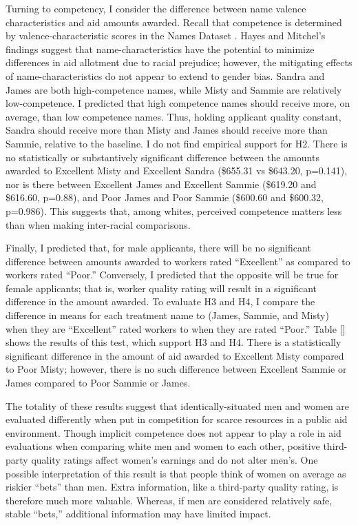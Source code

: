 \documentclass[12pt]{article}%
\begin{document}
\begin{doublespace}
Turning to competency, I consider the difference between name valence characteristics and aid amounts awarded. Recall that competence is determined by valence-characteristic scores in the Names Dataset \citep{hayes_2020}. Hayes and Mitchel’s findings suggest that name-characteristics have the potential to minimize differences in aid allotment due to racial prejudice; however, the mitigating effects of name-characteristics do not appear to extend to gender bias. Sandra and James are both high-competence names, while Misty and Sammie are relatively low-competence. I predicted that high competence names should receive more, on average, than low competence names. Thus, holding applicant quality constant, Sandra should receive more than Misty and James should receive more than Sammie, relative to the baseline. I do not find empirical support for H2. There is no statistically or substantively significant difference between the amounts awarded to Excellent Misty and Excellent Sandra (\$655.31 vs \$643.20, p=0.141), nor is there between Excellent James and Excellent Sammie (\$619.20 and \$616.60, p=0.88), and Poor James and Poor Sammie (\$600.60 and \$600.32, p=0.986). This suggests that, among whites, perceived competence matters less than when making inter-racial comparisons.


Finally, I predicted that, for male applicants, there will be no significant difference between amounts awarded to workers rated ``Excellent” as compared to workers rated ``Poor.” Conversely, I predicted that the opposite will be true for female applicants; that is, worker quality rating will result in a significant difference in the amount awarded. To evaluate H3 and H4, I compare the difference in means for each treatment name to (James, Sammie, and Misty) when they are ``Excellent” rated workers to when they are rated ``Poor.” Table [] shows the results of this test, which support H3 and H4. There is a statistically significant difference in the amount of aid awarded to Excellent Misty compared to Poor Misty; however, there is no such difference between Excellent Sammie or James compared to Poor Sammie or James.


The totality of these results suggest that identically-situated men and women are evaluated differently when put in competition for scarce resources in a public aid environment. Though implicit competence does not appear to play a role in aid evaluations when comparing white men and women to each other, positive third-party quality ratings affect women’s earnings and do not alter men’s. One possible interpretation of this result is that people think of women on average as riskier ``bets” than men. Extra information, like a third-party quality rating, is therefore much more valuable. Whereas, if men are considered relatively safe, stable ``bets,” additional information may have limited impact.


\end{doublespace}
\end{document}
